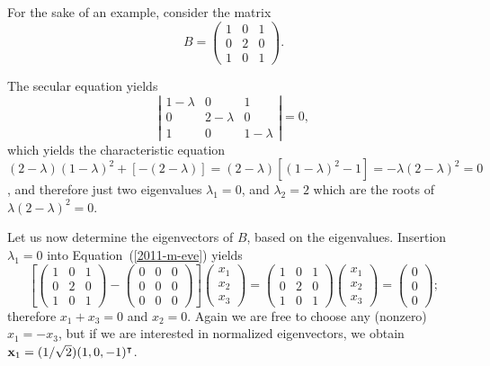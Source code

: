 {\color{blue}
\bexample
For the sake of an example, consider  the
{matrix}
\begin{equation}
B=
\begin{pmatrix}
1&0&1\\
0&2&0\\
1&0&1
\end{pmatrix}.
\label{2017-m-ch-fdvs-e-eev2}
\end{equation}

The secular equation yields
$$
\left|
\begin{matrix}
1-\lambda &0&1\\
0&2-\lambda &0\\
1&0&1-\lambda
\end{matrix}
\right| = 0,
$$
which yields the characteristic equation
$
(2-\lambda )(1-\lambda )^2 +[-(2-\lambda )]=
(2-\lambda )[(1-\lambda )^2 -1]=
-\lambda (2-\lambda )^2 =0$,
and therefore just two  eigenvalues
$\lambda_1=0$,  and
$\lambda_2=2$ which are the roots of $\lambda (2-\lambda )^2 =0$.

Let us now determine the eigenvectors of $B$, based on the eigenvalues.
Insertion  $\lambda_1=0$ into Equation~(\ref{2011-m-eve})  yields
\begin{equation}
\left[
\begin{pmatrix}
1&0&1\\
0&2&0\\
1&0&1
\end{pmatrix}  -
\begin{pmatrix}
0&0&0\\
0&0&0\\
0&0&0
\end{pmatrix}
\right]
\begin{pmatrix}
x_1\\
x_2\\
x_3
\end{pmatrix}
=
\begin{pmatrix}
1&0&1\\
0&2&0\\
1&0&1
\end{pmatrix}
\begin{pmatrix}
x_1\\
x_2\\
x_3
\end{pmatrix}
=
\begin{pmatrix}
0\\
0\\
0
\end{pmatrix}
;
\end{equation}
therefore $x_1+x_3=0$ and $x_2=0$.
Again we are free to choose any (nonzero) $x_1=-x_3$,
but if we are interested in normalized eigenvectors, we obtain
${\bf x}_1 =(1/\sqrt{2})(1,0,-1)^\intercal $.

}
